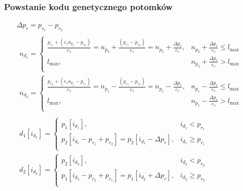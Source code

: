 \subsubsection{Powstanie kodu genetycznego potomków}
\label{subsubsec:list_d1_d2}
\vspace{-\parskip}
\begin{fleqn}
  \begin{gather}
    \label{math:list_delta}
    {\Delta p_r}=p_{r_1}-p_{r_2}\\
    \label{math:list_nd}
    \begin{gathered}
      n_{d_1}=\begin{cases}
        \frac{p_{r_1}
          + \left(e_s n_{p_2}-p_{r_2}\right)}{e_s}
          =n_{p_2}
            + \frac{\left(p_{r_1}-p_{r_2}\right)}{e_s}
          =n_{p_2}+\frac{{\Delta p_r}}{e_s}
            ,& n_{p_2}+\frac{{\Delta p_r}}{e_s}
              \leqslant l_{\max}\\
        l_{\max}
          ,& n_{p_2}+\frac{{\Delta p_r}}{e_s}>l_{\max}\\
      \end{cases}\\
      n_{d_2}=\begin{cases}
        \frac{p_{r_2}
          + \left(e_s n_{p_1}-p_{r_1}\right)}{e_s}
          =n_{p_1}
            - \frac{\left(p_{r_1}-p_{r_2}\right)}{e_s}
          =n_{p_1}-\frac{{\Delta p_r}}{e_s}
            ,& n_{p_1}-\frac{{\Delta p_r}}{e_s}
              \leqslant l_{\max}\\
        l_{\max}
          ,& n_{p_1}-\frac{{\Delta p_r}}{e_s}>l_{\max}\\
      \end{cases}
    \end{gathered}\\
    \begin{gathered}
      d_1\left[i_{d_1}\right]=\begin{cases}
        p_1[i_{d_1}]
          ,& i_{d_1} < p_{r_1}\\
        p_2[i_{d_1}-p_{r_1}+p_{r_2}]
          =p_2[i_{d_1}-{\Delta p_r}]
          ,& i_{d_1} \geqslant p_{r_1}\\
      \end{cases}\\
      d_2\left[i_{d_2}\right]=\begin{cases}
        p_2[i_{d_2}]
          ,& i_{d_2} < p_{r_2}\\
        p_1[i_{d_2}-p_{r_2}+p_{r_1}]
          =p_1[i_{d_2}+{\Delta p_r}]
          ,& i_{d_2} \geqslant p_{r_2}\\
      \end{cases}
    \end{gathered}
    \label{math:list_d}
  \end{gather}
\end{fleqn}
